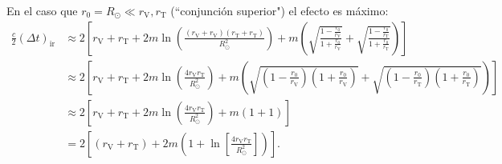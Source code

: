 \documentclass[letterpaper,11pt]{article}
\begin{document}
En el caso que $r_0 = R_{\odot} \ll r_{\text{V}}, r_{\text{T}}$ (``conjunción superior") el efecto es máximo:
\begin{align}
\frac{c}{2} (\Delta t)_{\text{ir}} &\approx 2 \left[ r_{\text{V}} + r_{\text{T}}  +2m \ln\left( \frac{(r_{\text{V}} + r_{\text{V}})(r_{\text{T}} + r_{\text{T}})}{R_{\odot}^2}\right) + m \left( \sqrt{\frac{1 - \frac{r_0}{r_{\text{V}}}}{1 + \frac{r_0}{r_{\text{V}}}}} + \sqrt{\frac{1 - \frac{r_0}{r_{\text{T}}}}{1 + \frac{r_0}{r_{\text{T}}}}} \right)\right] \nonumber\\
&\approx 2 \left[ r_{\text{V}} + r_{\text{T}} + 2m \ln\left(\frac{4r_{\text{V}} r_{\text{T}}}{R_{\odot}^2}\right)+ m \left( \sqrt{\left(1 - \frac{r_0}{r_{\text{V}}}\right)\left(1 + \frac{r_0}{r_{\text{V}}}\right)} + \sqrt{\left(1 - \frac{r_0}{r_{\text{T}}}\right)\left(1 + \frac{r_0}{r_{\text{T}}}\right)}\right) \right] \nonumber\\
&\approx  2 \left[ r_{\text{V}} + r_{\text{T}} + 2m \ln\left(\frac{4r_{\text{V}} r_{\text{T}}}{R_{\odot}^2}\right)+ m(1 + 1) \right] \nonumber\\
&= 2 \left[(r_{\text{V}} + r_{\text{T}}) + 2m \left(1 + \ln\left[\frac{4r_{\text{V}} r_{\text{T}}}{R_{\odot}^2}\right]\right)\right]. \label{eq:Shapiro-9}
\end{align}
\end{document}
